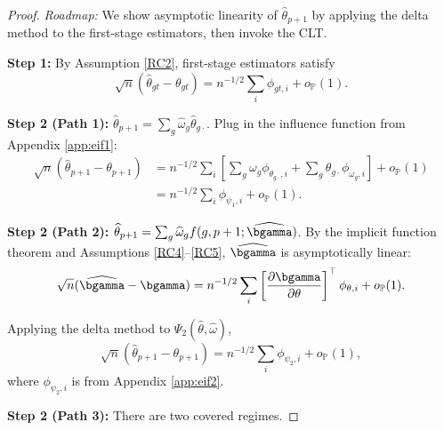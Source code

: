 \documentclass{article}
\renewcommand{\P}{\mathbb{P}}
\begin{document}
\begin{proof}
\textit{Roadmap:} We show asymptotic linearity of $\widehat{\theta}_{p+1}$ by applying the delta method to the first-stage estimators, then invoke the CLT.

\textbf{Step 1:} By Assumption \ref{RC2}, first-stage estimators satisfy
\[
\sqrt{n}(\widehat{\theta}_{gt} - \theta_{gt}) = n^{-1/2}\sum_i \phi_{gt,i} + o_{\P}(1).
\]

\textbf{Step 2 (Path 1):} $\widehat{\theta}_{p+1} = \sum_g \widehat{\omega}_g \widehat{\theta}_{g\cdot}$. Plug in the influence function from Appendix \ref{app:eif1}:
\begin{align*}
\sqrt{n}(\widehat{\theta}_{p+1} - \theta_{p+1}) &= n^{-1/2}\sum_i \left[\sum_g \omega_g \phi_{\theta_{g\cdot},i} + \sum_g \theta_{g\cdot} \phi_{\omega_g,i}\right] + o_{\P}(1) \\
&= n^{-1/2}\sum_i \phi_{\psi_1,i} + o_{\P}(1).
\end{align*}

\textbf{Step 2 (Path 2):} $\widehat{\theta}_{p+1} = \sum_g \widehat{\omega}_g f(g,p+1;\widehat{\bgamma})$. By the implicit function theorem and Assumptions \ref{RC4}--\ref{RC5}, $\widehat{\bgamma}$ is asymptotically linear:
\[
\sqrt{n}(\widehat{\bgamma} - \bgamma) = n^{-1/2}\sum_i \left[\frac{\partial \bgamma}{\partial \theta}\right]^\top \phi_{\theta,i} + o_{\P}(1).
\]

Applying the delta method to $\Psi_2(\widehat{\theta}, \widehat{\omega})$,
\[
\sqrt{n}(\widehat{\theta}_{p+1} - \theta_{p+1}) = n^{-1/2}\sum_i \phi_{\psi_2,i} + o_{\P}(1),
\]
where $\phi_{\psi_2,i}$ is from Appendix \ref{app:eif2}.

\textbf{Step 2 (Path 3):}
There are two covered regimes.


\end{proof}
\end{document}
